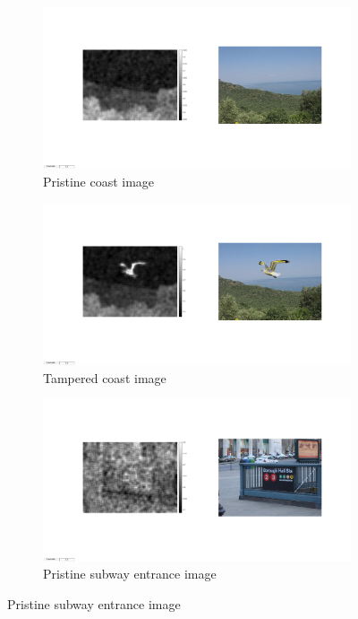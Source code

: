 \documentclass{template/acm_proc_article-sp}
\begin{document}
\begin{figure}[H]
\centering

\begin{subfigure}{0.46\textwidth}
    \includegraphics[trim=275 300 200 250,clip,width=\linewidth]{report/results/f2_seagull_orig.jpg}
    \caption{Pristine coast image}
\end{subfigure}

\begin{subfigure}{0.46\textwidth}
    \includegraphics[trim=275 300 200 250,clip,width=\linewidth]{report/results/f2_seagull.jpg}
    \caption{Tampered coast image}
\end{subfigure}

\begin{subfigure}{0.46\textwidth}
    \includegraphics[trim=275 300 200 250,clip,width=\linewidth]{report/results/f2_subway_orig.jpg}
    \caption{Pristine subway entrance image}
\end{subfigure}


\end{figure}
\end{document}
